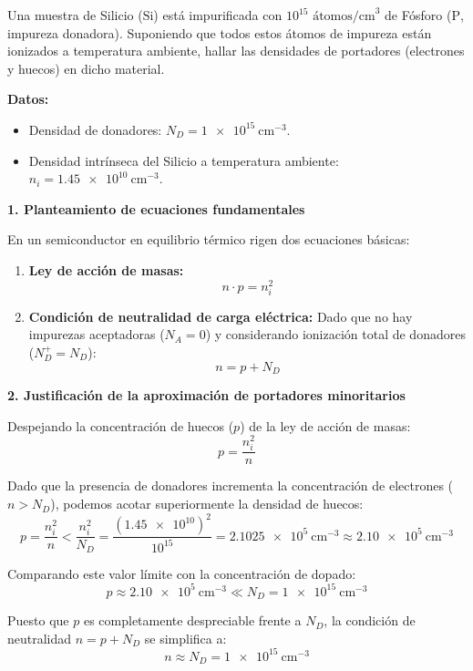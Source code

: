 \newpage
\seccionproblemas
\begin{problema}
Una muestra de Silicio ($\text{Si}$) está impurificada con $10^{15} \text{ átomos/cm}^3$ de Fósforo ($\text{P}$, impureza donadora). Suponiendo que todos estos átomos de impureza están ionizados a temperatura ambiente, hallar las densidades de portadores (electrones y huecos) en dicho material.

\textbf{Datos:}
\begin{itemize}
    \item Densidad de donadores: $N_D = \SI{1e15}{\cm^{-3}}$.
    \item Densidad intrínseca del Silicio a temperatura ambiente: $n_i = \SI{1.45e10}{\cm^{-3}}$.
\end{itemize}

\tcblower

\textbf{1. Planteamiento de ecuaciones fundamentales}

En un semiconductor en equilibrio térmico rigen dos ecuaciones básicas:
\begin{enumerate}
    \item \textbf{Ley de acción de masas:}
    \[
    n \cdot p = n_i^2
    \]
    \item \textbf{Condición de neutralidad de carga eléctrica:}
    Dado que no hay impurezas aceptadoras ($N_A = 0$) y considerando ionización total de donadores ($N_D^+ = N_D$):
    \[
    n = p + N_D
    \]
\end{enumerate}

\textbf{2. Justificación de la aproximación de portadores minoritarios}

Despejando la concentración de huecos ($p$) de la ley de acción de masas:
\[
p = \frac{n_i^2}{n}
\]

Dado que la presencia de donadores incrementa la concentración de electrones ($n > N_D$), podemos acotar superiormente la densidad de huecos:
\[
p = \frac{n_i^2}{n} < \frac{n_i^2}{N_D} = \frac{(\num{1.45e10})^2}{10^{15}} = \SI{2.1025e5}{\cm^{-3}} \approx \SI{2.10e5}{\cm^{-3}}
\]

Comparando este valor límite con la concentración de dopado:
\[
p \approx \SI{2.10e5}{\cm^{-3}} \ll N_D = \SI{1e15}{\cm^{-3}}
\]

Puesto que $p$ es completamente despreciable frente a $N_D$, la condición de neutralidad $n = p + N_D$ se simplifica a:
\[
n \approx N_D = \SI{1e15}{\cm^{-3}}
\]


\end{problema}
